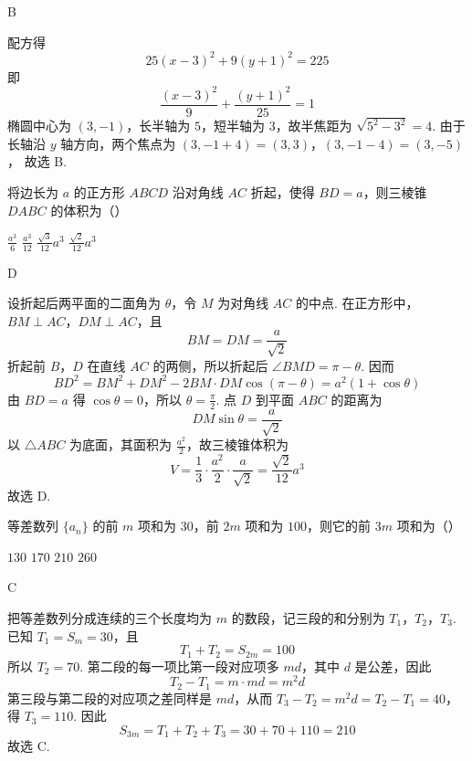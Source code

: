 \begin{answer}
B
\end{answer}

\begin{solution}
配方得
\[
25(x-3)^2+9(y+1)^2=225
\]
即
\[
\frac{(x-3)^2}{9}+\frac{(y+1)^2}{25}=1
\]
椭圆中心为 \((3,-1)\)，长半轴为 \(5\)，短半轴为 \(3\)，故半焦距为 \(\sqrt{5^2-3^2}=4\). 由于长轴沿 \(y\) 轴方向，两个焦点为
\((3,-1+4)=(3,3)\)，\((3,-1-4)=(3,-5)\)，
故选 B.
\end{solution}

\begin{problem}
将边长为 \(a\) 的正方形 \(ABCD\) 沿对角线 \(AC\) 折起，使得 \(BD = a\)，则三棱锥 \(DABC\) 的体积为（\quad）

\choices
    {\(\frac{a^3}{6}\)}
    {\(\frac{a^3}{12}\)}
    {\(\frac{\sqrt{3}}{12} a^3\)}
    {\(\frac{\sqrt{2}}{12} a^3\)}
\end{problem}

\begin{answer}
D
\end{answer}

\begin{solution}
设折起后两平面的二面角为 \(\theta\)，令 \(M\) 为对角线 \(AC\) 的中点. 在正方形中，\(BM\perp AC\)，\(DM\perp AC\)，且
\[
BM=DM=\frac{a}{\sqrt{2}}
\]
折起前 \(B\)，\(D\) 在直线 \(AC\) 的两侧，所以折起后 \(\angle BMD=\pi-\theta\). 因而
\[
BD^2=BM^2+DM^2-2BM\cdot DM\cos(\pi-\theta)=a^2(1+\cos\theta)
\]
由 \(BD=a\) 得 \(\cos\theta=0\)，所以 \(\theta=\frac{\pi}{2}\). 点 \(D\) 到平面 \(ABC\) 的距离为
\[
DM\sin\theta=\frac{a}{\sqrt{2}}
\]
以 \(\triangle ABC\) 为底面，其面积为 \(\frac{a^2}{2}\)，故三棱锥体积为
\[
V=\frac{1}{3}\cdot\frac{a^2}{2}\cdot\frac{a}{\sqrt{2}}=\frac{\sqrt{2}}{12}a^3
\]
故选 D.
\end{solution}

\begin{problem}
等差数列 \(\{a_{n}\}\) 的前 \(m\) 项和为 \(30\)，前 \(2m\) 项和为 \(100\)，则它的前 \(3m\) 项和为（\quad）

\choices
    {\(130\)}
    {\(170\)}
    {\(210\)}
    {\(260\)}
\end{problem}

\begin{answer}
C
\end{answer}

\begin{solution}
把等差数列分成连续的三个长度均为 \(m\) 的数段，记三段的和分别为 \(T_1\)，\(T_2\)，\(T_3\). 已知 \(T_1=S_m=30\)，且
\[
T_1+T_2=S_{2m}=100
\]
所以 \(T_2=70\). 第二段的每一项比第一段对应项多 \(md\)，其中 \(d\) 是公差，因此
\[
T_2-T_1=m\cdot md=m^2d
\]
第三段与第二段的对应项之差同样是 \(md\)，从而 \(T_3-T_2=m^2d=T_2-T_1=40\)，得 \(T_3=110\). 因此
\[
S_{3m}=T_1+T_2+T_3=30+70+110=210
\]
故选 C.
\end{solution}

